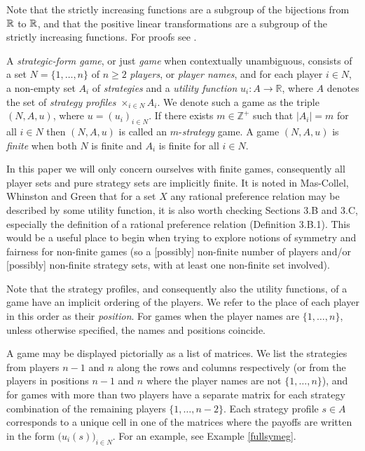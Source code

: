 	Note that the strictly increasing functions are a subgroup of the bijections from $\mathbb{R}$ to $\mathbb{R}$, and that the positive linear transformations are a subgroup of the strictly increasing functions. For proofs see \cite[Propositions 2.2.4 and 2.2.6]{ham2011honoursthesis}.
	
	A \textit{strategic-form game}, or just \textit{game} when contextually unambiguous, consists of a set $N = \{1, \ldots, n\}$ of $n \geq 2$ \textit{players}, or \textit{player names}, and for each player $i \in N$, a non-empty set $A_i$ of \textit{strategies} and a \textit{utility function} $u_i:A\rightarrow\mathbb{R}$, where $A$ denotes the set of \textit{strategy profiles} $\times_{i \in N}A_i$. We denote such a game as the triple $(N, A, u)$, where $u = (u_i)_{i \in N}$. If there exists $m \in \mathbb{Z}^+$ such that $|A_i| = m$ for all $i \in N$ then $(N, A, u)$ is called an $m$-\textit{strategy} game. A game $(N, A, u)$ is \textit{finite} when both $N$ is finite and $A_i$ is finite for all $i \in N$. 
	
	In this paper we will only concern ourselves with finite games, consequently all player sets and pure strategy sets are implicitly finite. It is noted in Mas-Collel, Whinston and Green \cite[Proposition 3.C.1]{Mas1995microeconomic} that for a set $X$ any rational preference relation may be described by some utility function, it is also worth checking Sections 3.B and 3.C, especially the definition of a rational preference relation (Definition 3.B.1). This would be a useful place to begin when trying to explore notions of symmetry and fairness for non-finite games (so a [possibly] non-finite number of players and/or [possibly] non-finite strategy sets, with at least one non-finite set involved). 
	
	Note that the strategy profiles, and consequently also the utility functions, of a game have an implicit ordering of the players. We refer to the place of each player in this order as their \textit{position}. For games when the player names are $\{1, \ldots, n\}$, unless otherwise specified, the names and positions coincide.
	
	A game may be displayed pictorially as a list of matrices. We list the strategies from players $n-1$ and $n$ along the rows and columns respectively (or from the players in positions $n-1$ and $n$ where the player names are not $\{1, \ldots, n\}$), and for games with more than two players have a separate matrix for each strategy combination of the remaining players $\{1, \ldots, n-2\}$. Each strategy profile $s \in A$ corresponds to a unique cell in one of the matrices where the payoffs are written in the form $\bigl(u_i(s)\bigr)_{i \in N}$. For an example, see Example \ref{fullsymeg}.
	
